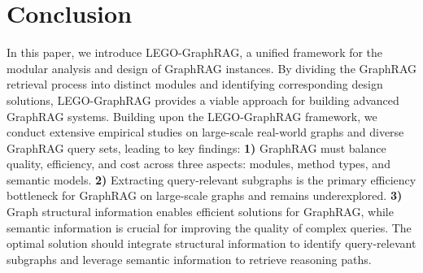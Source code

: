 
\section{Conclusion}
\label{section: conclusion}
In this paper, we introduce LEGO-GraphRAG, a unified framework for the modular analysis and design of GraphRAG instances. By dividing the GraphRAG retrieval process into distinct modules and identifying corresponding design solutions, LEGO-GraphRAG provides a viable approach for building advanced GraphRAG systems.
Building upon the LEGO-GraphRAG framework, we conduct extensive empirical studies on large-scale real-world graphs and diverse GraphRAG query sets, leading to key findings:
{\bf 1)} GraphRAG must balance quality, efficiency, and cost across three aspects: modules, method types, and semantic models.
{\bf 2)} Extracting query-relevant subgraphs is the primary efficiency bottleneck for GraphRAG on large-scale graphs and remains underexplored.
{\bf 3)} Graph structural information enables efficient solutions for GraphRAG, while semantic information is crucial for improving the quality of complex queries. The optimal solution should integrate structural information to identify query-relevant subgraphs and leverage semantic information to retrieve reasoning paths.



